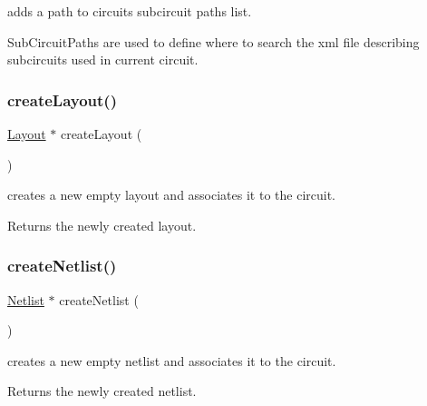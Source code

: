 adds a path to circuit\textquotesingle{}s subcircuit paths list. 

Sub\+Circuit\+Paths are used to define where to search the xml file describing subcircuits used in current circuit. \mbox{\label{class_open_chams_1_1_circuit_a725a691b0117c4b913b54e7bfd92832f}} 
\subsubsection{\texorpdfstring{create\+Layout()}{createLayout()}}
{\footnotesize\ttfamily \hyperlink{class_open_chams_1_1_layout}{Layout} $\ast$ create\+Layout (\begin{DoxyParamCaption}{ }\end{DoxyParamCaption})}



creates a new empty layout and associates it to the circuit. 

\begin{DoxyReturn}{Returns}
the newly created layout. 
\end{DoxyReturn}
\mbox{\label{class_open_chams_1_1_circuit_a3f11671c7ea7b4e2cc3487bd7954b667}} 
\subsubsection{\texorpdfstring{create\+Netlist()}{createNetlist()}}
{\footnotesize\ttfamily \hyperlink{class_open_chams_1_1_netlist}{Netlist} $\ast$ create\+Netlist (\begin{DoxyParamCaption}{ }\end{DoxyParamCaption})}



creates a new empty netlist and associates it to the circuit. 

\begin{DoxyReturn}{Returns}
the newly created netlist. 
\end{DoxyReturn}
\mbox{\label{class_open_chams_1_1_circuit_a57a79a9916df4512648bb195decb7250}} 
